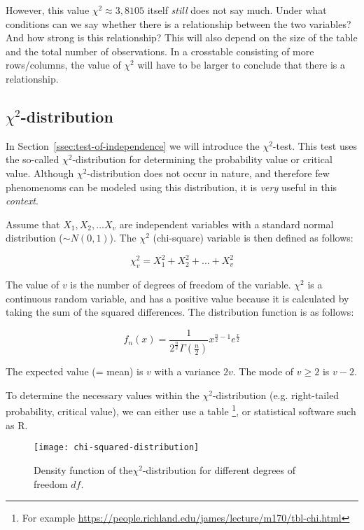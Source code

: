 However, this value $\chi^2 \approx 3,8105$ itself \emph{still} does not say much. Under what conditions can we say whether there is a relationship between the two variables? And how strong is this relationship? This will also depend on the size of the table and the total number of observations. In a crosstable consisting of more rows/columns, the value of $\chi^2$ will have to be larger to conclude that there is a relationship.

\subsection[Chi-squared Distribution]{$\chi^{2}$-distribution}
\label{ssec:chi-squared-distribution}

In Section~\ref{ssec:test-of-independence} we will introduce the $\chi^2$-test. This test uses the so-called $\chi^2$-distribution for determining the probability value or critical value. Although $\chi^2$-distribution does not occur in nature, and therefore few phenomenoms can be modeled using this distribution, it is \emph{very} useful in this \emph{context}.

Assume that  $X_{1}, X_{2}, \dots X_{v}$ are independent variables with a standard normal distribution ($\sim N(0,1)$). The $\chi^{2}$ (chi-square) variable is then defined as follows:

\[ \chi^{2}_{v} = X_{1}^{2} + X_{2}^{2} + \dots + X_{v}^{2} \]

The value of $v$ is the number of degrees of freedom of the variable. $\chi^{2}$ is a continuous random variable, and has a positive value because it is calculated by taking the sum of the squared differences. The distribution function is as follows:

\[ f_{n}(x) = \frac{1}{2^{\frac{n}{2}}\Gamma(\frac{n}{2})} x^{\frac{n}{2} -1} e^{\frac{x}{2}} \]

The expected value (= mean) is $v$ with a variance $2v$. The mode of $v \geq 2$ is $v-2$.

To determine the necessary values within the $\chi^{2}$-distribution (e.g. right-tailed probability, critical value), we can either use a table \footnote{For example \url{https://people.richland.edu/james/lecture/m170/tbl-chi.html}}, or statistical software such as R.

\begin{figure}
  \texttt{[image: chi-squared-distribution]}
  \caption{Density function of the$\chi^2$-distribution for different degrees of freedom $df$.}
  \label{fig:chi-squared-distribution}
\end{figure}

